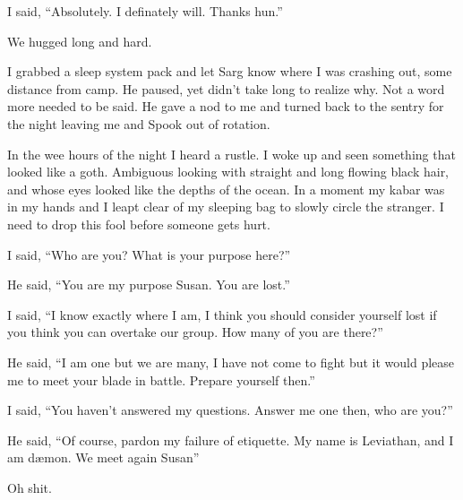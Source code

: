 I said, ``Absolutely. I definately will. Thanks hun.''

We hugged long and hard.

I grabbed a sleep system pack and let Sarg know where I was crashing out, some distance from camp. He paused, yet didn't take long to realize why. Not a word more needed to be said. He gave a nod to me and turned back to the sentry for the night leaving me and Spook out of rotation.

In the wee hours of the night I heard a rustle. I woke up and seen something that looked like a goth. Ambiguous looking with straight and long flowing black hair, and whose eyes looked like the depths of the ocean. In a moment my kabar was in my hands and I leapt clear of my sleeping bag to slowly circle the stranger. I need to drop this fool before someone gets hurt.

I said, ``Who are you? What is your purpose here?''

He said, ``You are my purpose Susan. You are lost.''

I said, ``I know exactly where I am, I think you should consider yourself lost if you think you can overtake our group. How many of you are there?''

He said, ``I am one but we are many, I have not come to fight but it would please me to meet your blade in battle. Prepare yourself then.''

I said, ``You haven't answered my questions. Answer me one then, who are you?''

He said, ``Of course, pardon my failure of etiquette. My name is Leviathan, and I am d\ae mon. We meet again Susan''

Oh shit.
